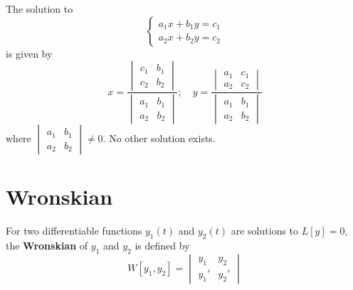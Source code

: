 \documentclass[twoside]{report}
\begin{document}
    \begin{btheorem}
        The solution to
        \begin{equation}
            \begin{cases}
                a_{1}x + b_{1}y = c_{1}\\
                a_{2}x + b_{2}y = c_{2}
            \end{cases}
        \end{equation}
        is given by
        \begin{equation}
            x = \frac{\begin{vmatrix}
                c_{1} & b_{1}\\
                c_{2} & b_{2}
            \end{vmatrix}}{\begin{vmatrix}
                a_{1} & b_{1}\\
                a_{2} & b_{2}
            \end{vmatrix}};\quad
            y = \frac{\begin{vmatrix}
                a_{1} & c_{1}\\
                a_{2} & c_{2}
            \end{vmatrix}}{\begin{vmatrix}
                a_{1} & b_{1}\\
                a_{2} & b_{2}
            \end{vmatrix}}
        \end{equation}
        where $\begin{vmatrix}a_{1} & b_{1}\\a_{2} & b_{2}\end{vmatrix} \neq 0$. No other solution exists.
    \end{btheorem}
    \section{Wronskian}
    \begin{definition}[Wronskian]
        For two differentiable functions $y_{1}(t)$ and $y_{2}(t)$ are solutions to $L[y]= 0$, the \textbf{Wronskian} of $y_{1}$ and $y_{2}$ is defined by
        \begin{equation}
            W[y_{1}, y_{2}] = \begin{vmatrix}
                y_{1} & y_{2}\\
                y_{1}' & y_{2}'
            \end{vmatrix}
        \end{equation}
    \end{definition}
    \np
\end{document}

